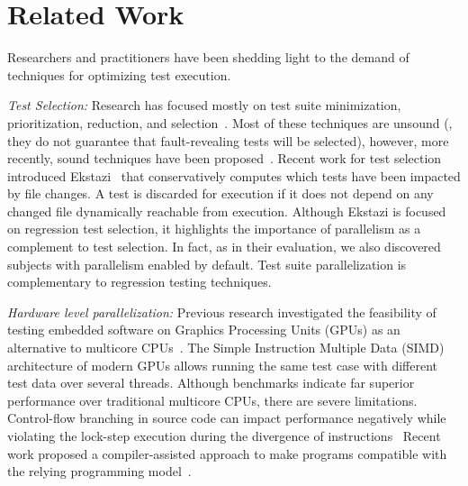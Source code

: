 \section{Related Work}
\label{sec:related}
Researchers and practitioners have been shedding light to the demand
of techniques for optimizing test execution.


\textit{Test Selection:} Research has focused mostly on test suite
minimization, prioritization, reduction, and
selection~\cite{yoo-harman-stvr2012}.   Most of these
techniques are unsound (\ie{}, they do not guarantee that
fault-revealing tests will be selected), however, more recently, sound
techniques have been
proposed~\cite{gligoric-etal-issta2015,soetens-etal-2016}. Recent work
for test selection introduced
Ekstazi~\cite{ekstazi-web,gligoric-etal-issta2015} that conservatively
computes which tests have been impacted by file changes.  A test is
discarded for execution if it does not depend on any changed file
dynamically reachable from execution. Although Ekstazi is focused on
regression test selection, it highlights the importance of parallelism
as a complement to test selection.  In fact, as in their evaluation,
we also discovered subjects with parallelism enabled by default.  Test
suite parallelization is complementary to regression testing
techniques.

\textit{Hardware level parallelization:} Previous research
investigated the feasibility of testing embedded software on Graphics
Processing Units (GPUs) as an alternative to multicore
CPUs~\cite{rajan-etal-ase2014}.  The Simple Instruction Multiple Data
(SIMD) architecture of modern GPUs allows running the same test case
with different test data over several threads.  Although benchmarks
indicate far superior performance over traditional multicore CPUs,
there are severe limitations. Control-flow branching in source code
can impact performance negatively while violating the lock-step
execution during the divergence of instructions~\cite{rajan-etal-ase2017}
Recent work proposed a compiler-assisted approach to make
programs compatible with the relying programming
model~\cite{yaneva-etal-issta2017}.

